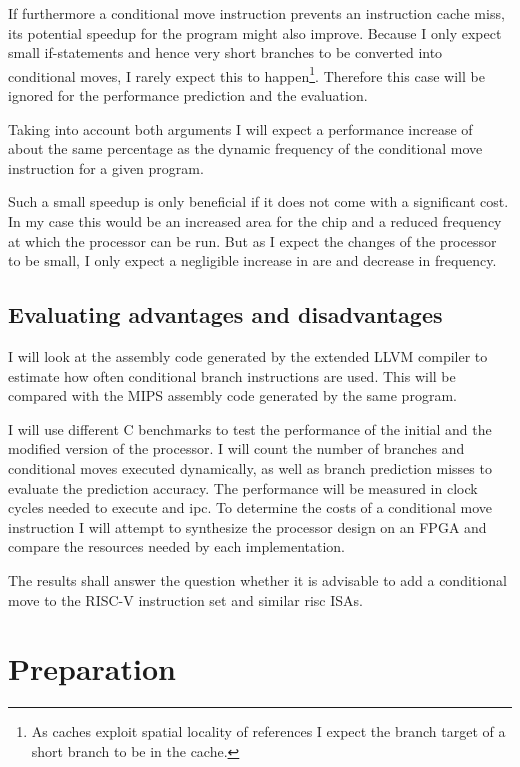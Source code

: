 \documentclass[12pt,twoside,notitlepage]{report}
\begin{document}
If furthermore a conditional move instruction prevents an instruction cache miss, its potential speedup for the program might also improve. Because I only expect small if-statements and hence very short branches to be converted into conditional moves, I rarely expect this to happen\footnote{As caches exploit spatial locality of references I expect the branch target of a short branch to be in the cache.}. Therefore this case will be ignored for the performance prediction and the evaluation.

Taking into account both arguments I will expect a performance increase of about the same percentage as the dynamic frequency of the conditional move instruction for a given program.

Such a small speedup is only beneficial if it does not come with a significant cost. In my case this would be an increased area for the chip and a reduced frequency at which the processor can be run. But as I expect the changes of the processor to be small, I only expect a negligible increase in are and decrease in frequency. 


\section{Evaluating advantages and disadvantages}

I will look at the assembly code generated by the extended LLVM compiler to estimate how often conditional branch instructions are used. This will be compared with the MIPS assembly code generated by the same program.

I will use different C benchmarks to test the performance of the initial and the modified version of the processor. I will count the number of branches and conditional moves executed dynamically, as well as branch prediction misses to evaluate the prediction accuracy. The performance will be measured in clock cycles needed to execute and \gls{ipc}. To determine the costs of a conditional move instruction I will attempt to synthesize the processor design on an FPGA and compare the resources needed by each implementation.

The results shall answer the question whether it is advisable to add a conditional move to the RISC-V instruction set and similar \gls{risc} \gls{ISA}s.

\chapter{Preparation}
\end{document}
